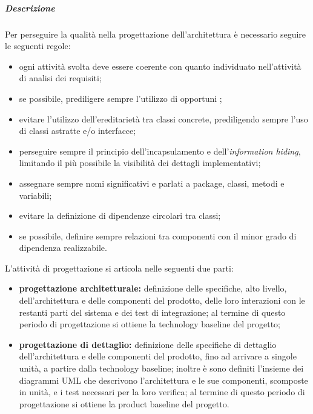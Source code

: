 				\subparagraph{Descrizione}
					Per perseguire la qualità nella progettazione dell'architettura è necessario seguire le seguenti regole:
					\begin{itemize}
						\item ogni attività svolta deve essere coerente con quanto individuato nell'attività di analisi dei requisiti;
						\item se possibile, prediligere sempre l'utilizzo di opportuni ;
						\item evitare l'utilizzo dell'ereditarietà tra classi concrete, prediligendo sempre l'uso di classi astratte e/o interfacce;
						\item perseguire sempre il principio dell'incapsulamento e dell'\textit{information hiding}, limitando il più possibile la visibilità dei dettagli implementativi;
						\item assegnare sempre nomi significativi e parlati a package, classi, metodi e variabili;
						\item evitare la definizione di dipendenze circolari tra classi;
						\item se possibile, definire sempre relazioni tra componenti con il minor grado di dipendenza realizzabile.
					\end{itemize}
					L'attività di progettazione si articola nelle seguenti due parti: 
					\begin{itemize}
						\item \textbf{progettazione architetturale:} definizione delle specifiche, alto livello, dell'architettura e delle componenti del prodotto, delle loro interazioni con le restanti parti del sistema e dei test di integrazione; al termine di questo periodo di progettazione si ottiene la technology baseline del progetto;
						\item \textbf{progettazione di dettaglio:} definizione delle specifiche di dettaglio dell'architettura e delle componenti del prodotto, fino ad arrivare a singole unità, a partire dalla technology baseline; inoltre è sono definiti l'insieme dei diagrammi UML che descrivono l'architettura e le sue componenti, scomposte in unità, e i test necessari per la loro verifica; al termine di questo periodo di progettazione si ottiene la product baseline del progetto.
					\end{itemize}
					
